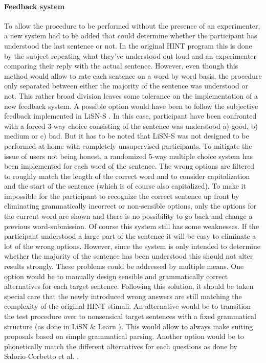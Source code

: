 \documentclass[a4paper,11pt]{article}%
\renewcommand{\\}{\vspace*{0.5\baselineskip} \newline}
\begin{document}
\paragraph{Feedback system} To allow the procedure to be performed without the presence of an experimenter, a new system had to be added that could determine whether the participant has understood the last sentence or not. In the original \ac{HINT} program this is done by the subject repeating what they've understood out loud and an experimenter comparing their reply with the actual sentence. However, even though this method would allow to rate each sentence on a word by word basis, the procedure only separated between either the majority of the sentence was understood or not. This rather broad division leaves some tolerance on the implementation of a new feedback system. A possible option would have been to follow the subjective feedback implemented in \ac{LiSN-S} \cite{Cameron2007}. In this case, participant have been confronted with a forced 3-way choice consisting of the sentence was understood a) good, b) medium or c) bad. But it has to be noted that \ac{LiSN-S} was not designed to be performed at home with completely unsupervised participants. To mitigate the issue of users not being honest, a randomized 5-way multiple choice system has been implemented for each word of the sentence. The wrong options are filtered to roughly match the length of the correct word and to consider capitalization and the start of the sentence (which is of course also capitalized). To make it impossible for the participant to recognize the correct sentence up front by eliminating grammatically incorrect or non-sensible options, only the options for the current word are shown and there is no possibility to go back and change a previous word-submission. Of course this system still has some weaknesses. If the participant understood a large part of the sentence it will be easy to eliminate a lot of the wrong options. However, since the system is only intended to determine whether the majority of the sentence has been understood this should not alter results strongly.
\newline
\newline
These problems could be addressed by multiple means. One option would be to manually design sensible and grammatically correct alternatives for each target sentence. Following this solution, it should be taken special care that the newly introduced wrong answers are still matching the complexity of the original \ac{HINT} stimuli. An alternative would be to transition the test procedure over to nonsensical target sentences with a fixed grammatical structure (as done in \ac{LiSN} \& Learn \cite{Cameron2011}). This would allow to always make suiting proposals based on simple grammatical parsing. Another option would be to phonetically match the different alternatives for each questions as done by Salorio-Corbetto et al. \cite{salorioevaluating}.
\end{document}
